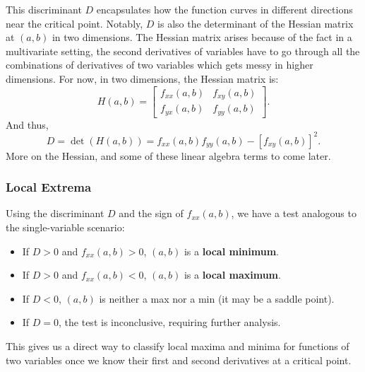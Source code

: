\noindent This discriminant \( D \) encapsulates how the function curves in different directions near the critical point. Notably, \( D \) is also the determinant of the Hessian matrix at \((a,b)\) in two dimensions. The Hessian matrix arises because of the fact in a multivariate setting, the second derivatives of variables have to go through all the combinations of derivatives of two variables which gets messy in higher dimensions. For now, in two dimensions, the Hessian matrix  is:
\[
H(a,b) = \begin{bmatrix} f_{xx}(a,b) & f_{xy}(a,b) \\ f_{yx}(a,b) & f_{yy}(a,b) \end{bmatrix}.
\]
And thus, 
\[
D=\det(H(a,b))=f_{xx}(a,b)f_{yy}(a,b)-[f_{xy}(a,b)]^2.
\]
More on the Hessian, and some of these linear algebra terms to come later.

\subsubsection*{Local Extrema} 

\noindent Using the discriminant \( D \) and the sign of \( f_{xx}(a,b) \), we have a test analogous to the single-variable scenario:
\begin{itemize}
    \item If \( D > 0 \) and \( f_{xx}(a,b) > 0 \), \((a,b)\) is a \textbf{local minimum}.
    \item If \( D > 0 \) and \( f_{xx}(a,b) < 0 \), \((a,b)\) is a \textbf{local maximum}.
    \item If \( D < 0 \), \((a,b)\) is neither a max nor a min (it may be a saddle point).
    \item If \( D = 0 \), the test is inconclusive, requiring further analysis.
\end{itemize}

\noindent This gives us a direct way to classify local maxima and minima for functions of two variables once we know their first and second derivatives at a critical point.

